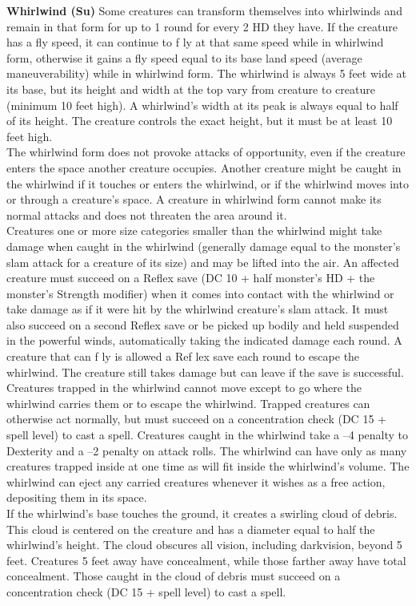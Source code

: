 \textbf{Whirlwind (Su)} Some creatures can transform themselves into whirlwinds and remain in that form for up to 1 round for every 2 HD they have. If the creature has a fly speed, it can continue to f ly at that same speed while in whirlwind form, otherwise it gains a fly speed equal to its base land speed (average maneuverability) while in whirlwind form.
The whirlwind is always 5 feet wide at its base, but its height and width at the top vary from creature to creature (minimum 10 feet high). A whirlwind’s width at its peak is always equal to half of its height. The creature controls the exact height, but it must be at least 10 feet high. \\

The whirlwind form does not provoke attacks of opportunity, even if the creature enters the space another creature occupies. Another creature might be caught in the whirlwind if it touches or enters the whirlwind, or if the whirlwind moves into or through a creature’s space. A creature in whirlwind form cannot make its normal attacks and does not threaten the area around it. \\

Creatures one or more size categories smaller than the whirlwind might take damage when caught in the whirlwind (generally damage equal to the monster’s slam attack for a creature of its size) and may be lifted into the air. An affected creature must succeed on a Reflex save (DC 10 + half monster’s HD + the monster’s Strength modifier) when it comes into contact with the whirlwind or take damage as if it were hit by the whirlwind creature’s slam attack. It must also succeed on a second Reflex save or be picked up bodily and held suspended in the powerful winds, automatically taking the indicated damage each round. A creature that can f ly is allowed a Ref lex save each round	to escape the whirlwind. The creature still takes damage but can leave if the save is successful. \\

Creatures trapped in the whirlwind cannot move except to go where the whirlwind carries them or to escape the whirlwind. Trapped creatures can otherwise act normally, but must succeed on a concentration check (DC 15 + spell level) to cast a spell. Creatures caught in the whirlwind take a –4 penalty to Dexterity and a –2 penalty on attack rolls. The whirlwind can have only as many creatures trapped inside at one time as will fit inside the whirlwind’s volume. The whirlwind can eject any carried creatures whenever it wishes as a free action, depositing them in its space. \\

If the whirlwind’s base touches the ground, it creates a swirling cloud of debris. This cloud is centered on the creature and has a diameter equal to half the whirlwind’s height. The cloud obscures all vision, including darkvision, beyond 5 feet. Creatures 5 feet away have concealment, while those farther away have total concealment. Those caught in the cloud of debris must succeed on a concentration check (DC 15 + spell level) to cast a spell. \\

\newpage
